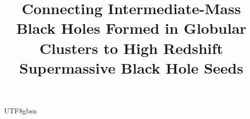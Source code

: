 \documentclass[trackchanges, twocolappendix, twocolumn]{aastex701}
\begin{document}
\begin{CJK*}{UTF8}{gbsn}

\title{Connecting Intermediate-Mass Black Holes Formed in Globular Clusters to High Redshift Supermassive Black Hole Seeds}



\end{CJK*}
\end{document}
